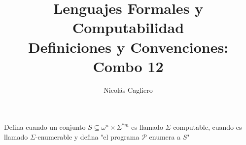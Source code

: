 \documentclass{article}
\title{Lenguajes Formales y Computabilidad \\
        \large Definiciones y Convenciones: Combo 12 }
\author{Nicolás Cagliero}
\begin{document}
\maketitle

Defina cuando un conjunto $S \subseteq \omega^n \times \Sigma^{*m}$ es llamado
$\Sigma$-computable, cuando es llamado $\Sigma$-enumerable y defina 
"el programa $\mathcal{P}$ enumera a $S$"
\end{document}
